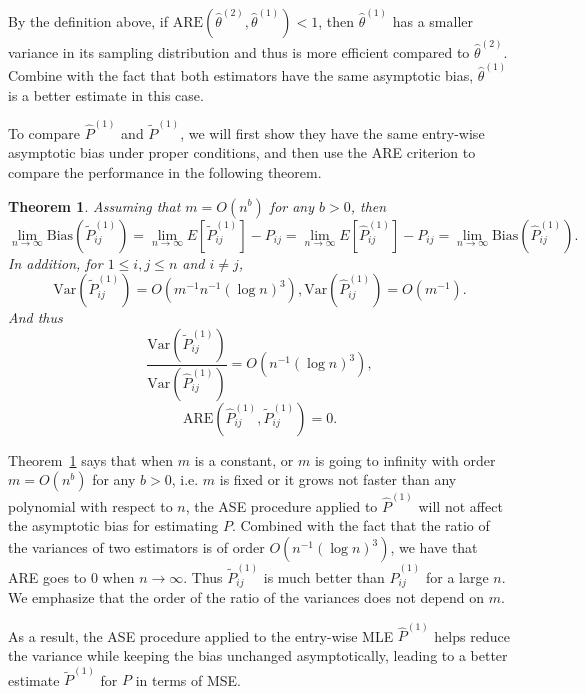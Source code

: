 \documentclass[a4paper]{article}
\newtheorem{theorem}[fact]{Theorem}
\renewcommand{\hat}{\widehat}
\begin{document}
By the definition above, if $\mathrm{ARE}(\hat{\theta}^{(2)}, \hat{\theta}^{(1)}) < 1$, then $\hat{\theta}^{(1)}$ has a smaller variance in its sampling distribution and thus is more efficient compared to $\hat{\theta}^{(2)}$. Combine with the fact that both estimators have the same asymptotic bias, $\hat{\theta}^{(1)}$ is a better estimate in this case.

To compare $\hat{P}^{(1)}$ and $\widetilde{P}^{(1)}$, we will first show they have the same entry-wise asymptotic bias under proper conditions, and then use the ARE criterion to compare the performance in the following theorem.

\begin{theorem}
\label{thm:MLEvsMLEASE}
Assuming that $m = O(n^b)$ for any $b > 0$, then
\[
	\lim_{n \to \infty} \mathrm{Bias}(\widetilde{P}_{ij}^{(1)}) = \lim_{n \to \infty} E[\widetilde{P}_{ij}^{(1)}] - P_{ij} = \lim_{n \to \infty} E[\hat{P}^{(1)}_{ij}] - P_{ij}
    = \lim_{n \to \infty} \mathrm{Bias}(\hat{P}_{ij}^{(1)}).
\]
In addition, for $1 \le i, j \le n$ and $i \ne j$,
\[
	\mathrm{Var}(\widetilde{P}_{ij}^{(1)}) = O(m^{-1} n^{-1} (\log n)^3),
	\mathrm{Var}(\hat{P}_{ij}^{(1)}) = O(m^{-1}).
\]
And thus
\[
	\frac{\mathrm{Var}(\widetilde{P}_{ij}^{(1)})}{\mathrm{Var}(\hat{P}_{ij}^{(1)})}
    = O(n^{-1} (\log n)^3),
\]
\[
	\mathrm{ARE}(\hat{P}_{ij}^{(1)}, \widetilde{P}_{ij}^{(1)}) = 0.
\]
\end{theorem}

Theorem~\ref{thm:MLEvsMLEASE} says that when $m$ is a constant, or $m$ is going to infinity with order $m = O(n^b)$ for any $b > 0$, i.e. $m$ is fixed or it grows not faster than any polynomial with respect to $n$, the ASE procedure applied to $\hat{P}^{(1)}$ will not affect the asymptotic bias for estimating $P$.
Combined with the fact that the ratio of the variances of two estimators is of order $O(n^{-1} (\log n)^3)$, we have that ARE goes to 0 when $n \to \infty$. Thus $\widetilde{P}_{ij}^{(1)}$ is much better than $\hat{P}_{ij}^{(1)}$ for a large $n$. We emphasize that the order of the ratio of the variances does not depend on $m$.


As a result, the ASE procedure applied to the entry-wise MLE $\hat{P}^{(1)}$ helps reduce the variance while keeping the bias unchanged asymptotically, leading to a better estimate $\widetilde{P}^{(1)}$ for $P$ in terms of MSE.
\end{document}
